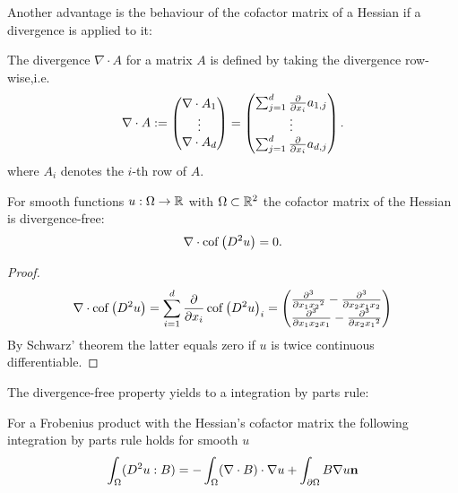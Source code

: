 Another advantage is the behaviour of the cofactor matrix of a Hessian if a divergence is applied to it:
\begin{definition}
The divergence $\nabla \cdot A$ for a matrix $A$ is defined by taking the divergence row-wise,i.e.
\[
	\nabla \cdot A := \begin{pmatrix} \nabla \cdot A_1 \\ \vdots \\ \nabla \cdot A_d\end{pmatrix}
	= \begin{pmatrix} \sum_{j = 1}^{d} \frac \partial {\partial x_i} a_{1,j} \\ \vdots \\ \sum_{j = 1}^{d} \frac \partial {\partial x_i} a_{d,j}\end{pmatrix}.
\]
where $A_i$ denotes the $i$-th row of $A$.
	
\end{definition}

\begin{lemma} \label{la: divergence free cof}
For smooth functions $u:\Omega \rightarrow \mathbb{R}$ with $\Omega \subset \mathbb{R}^2$ the cofactor matrix of the Hessian is divergence-free:
\[
	\nabla \cdot \operatorname{cof} \left( D^2 u \right) = 0.
\] 
\end{lemma}
\begin{proof}
\begin{align*}
	\nabla \cdot \operatorname{cof} \left( D^2 u \right) = \sum_{i=1}^{d} \frac \partial {\partial  x_i}\operatorname{cof} \left( D^2 u \right)_i = 
	\begin{pmatrix}
		\frac {\partial^3} {\partial x_1 {x_2}^2 } -\frac {\partial^3} {\partial{x_2} x_1 {x_2}} \\
				\frac {\partial^3} {\partial {x_1}x_2 {x_1}} -\frac {\partial^3} {\partial x_2 {x_1}^2 }
	\end{pmatrix}
\end{align*}
By Schwarz' theorem the latter equals zero if $u$ is twice continuous differentiable.
\end{proof}

The divergence-free property yields to a integration by parts rule:
\begin{lemma} \label{la: integration by parts Frobenius}
For a Frobenius product with the Hessian's cofactor matrix  the following integration by parts rule holds for smooth $u$
\[
	\int_\Omega (D^2 u : B) = - \int_\Omega (\nabla \cdot B) \cdot \nabla u + \int_{\partial \Omega}  B \nabla u \bf n
\] 
\end{lemma}

